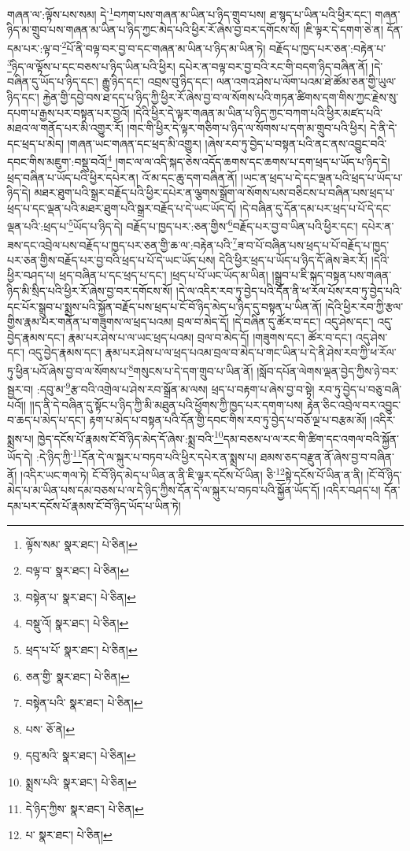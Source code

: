 གཞན་ལ་:ལྟོས་པས་སམ། དེ་\footnote{ལྟོས་སམ་  སྣར་ཐང་།  པེ་ཅིན། }བཀག་པས་གཞན་མ་ཡིན་པ་ཉིད་གྲུབ་པས། ཐ་སྙད་པ་ཡིན་པའི་ཕྱིར་དང་། གཞན་ཉིད་མ་གྲུབ་པས་གཞན་མ་ཡིན་པ་ཉིད་ཀྱང་མེད་པའི་ཕྱིར་རོ་ཞེས་བྱ་བར་དགོངས་སོ། །ཇི་ལྟར་དེ་དགག་ཅེ་ན། དོན་དམ་པར་:ལྟ་བ་\footnote{བལྟ་བ་  སྣར་ཐང་།  པེ་ཅིན། }པོ་ནི་བལྟ་བར་བྱ་བ་དང་གཞན་མ་ཡིན་པ་ཉིད་མ་ཡིན་ཏེ། བརྗོད་པ་ཁྱད་པར་ཅན་:བརྟེན་པ་\footnote{བསྟེན་པ་  སྣར་ཐང་།  པེ་ཅིན། }ཉིད་ལ་ལྟོས་པ་དང་བཅས་པ་ཉིད་ཡིན་པའི་ཕྱིར། དཔེར་ན་བལྟ་བར་བྱ་བའི་རང་གི་བདག་ཉིད་བཞིན་ནོ། །དེ་བཞིན་དུ་ཡོད་པ་ཉིད་དང་། རྒྱུ་ཉིད་དང་། འབྲས་བུ་ཉིད་དང་། ལན་འགའ་ཤེས་པ་ལོག་པའམ་ཐེ་ཚོམ་ཅན་གྱི་ཡུལ་ཉིད་དང་། རྐྱེན་གྱི་དབྱེ་བས་ཐ་དད་པ་ཉིད་ཀྱི་ཕྱིར་རོ་ཞེས་བྱ་བ་ལ་སོགས་པའི་གཏན་ཚིགས་དག་གིས་ཀྱང་རྗེས་སུ་དཔག་པ་རྒྱས་པར་བསྟན་པར་བྱའོ། །དེའི་ཕྱིར་དེ་ལྟར་གཞན་མ་ཡིན་པ་ཉིད་ཀྱང་བཀག་པའི་ཕྱིར་མཛད་པའི་མཐའ་ལ་གནོད་པར་མི་འགྱུར་རོ། །གང་གི་ཕྱིར་དེ་ལྟར་གཅིག་པ་ཉིད་ལ་སོགས་པ་དག་མ་གྲུབ་པའི་ཕྱིར། དེ་ནི་དེ་དང་ཕྲད་པ་མེད། །གཞན་ཡང་གཞན་དང་ཕྲད་མི་འགྱུར། །ཞེས་རབ་ཏུ་བྱེད་པ་བསྟན་པའི་ནང་ནས་འབྱུང་བའི་དབང་གིས་མཇུག་:བསྡུ་བའོ།\footnote{བསྡུ་འོ།  སྣར་ཐང་།  པེ་ཅིན། } །གང་ལ་ལ་འདི་སྐད་ཅེས་འདོད་ཆགས་དང་ཆགས་པ་དག་ཕྲད་པ་ཡོད་པ་ཉིད་དེ། ཕྲད་བཞིན་པ་ཡོད་པའི་ཕྱིར་དཔེར་ན། འོ་མ་དང་ཆུ་དག་བཞིན་ནོ། །ཡང་ན་ཕྲད་པ་དེ་དང་ལྡན་པའི་ཕྲད་པ་ཡོད་པ་ཉིད་དེ། མཐར་ཐུག་པའི་སྒྲར་བརྗོད་པའི་ཕྱིར་དཔེར་ན་ལྕགས་སྒྲོག་ལ་སོགས་པས་བཅིངས་པ་བཞིན་པས་ཕྲད་པ་ཕྲད་པ་དང་ལྡན་པའི་མཐར་ཐུག་པའི་སྒྲར་བརྗོད་པ་དེ་ཡང་ཡོད་དོ། །དེ་བཞིན་དུ་དོན་དམ་པར་ཕྲད་པ་པོ་དེ་དང་ལྡན་པའི་:ཕྲད་པ་\footnote{ཕྲད་པ་པོ་  སྣར་ཐང་།  པེ་ཅིན། }ཡོད་པ་ཉིད་དེ། བརྗོད་པ་ཁྱད་པར་:ཅན་གྱིས་\footnote{ཅན་གྱི་  སྣར་ཐང་།  པེ་ཅིན། }བརྗོད་པར་བྱ་བ་ཡིན་པའི་ཕྱིར་དང་། དཔེར་ན་ཟས་དང་འབྲེལ་པས་བརྗོད་པ་ཁྱད་པར་ཅན་གྱི་ཆ་ལ་:བརྟེན་པའི་\footnote{བསྟེན་པའི་  སྣར་ཐང་།  པེ་ཅིན། }ཟ་བ་པོ་བཞིན་པས་ཕྲད་པ་པོ་བརྗོད་པ་ཁྱད་པར་ཅན་གྱིས་བརྗོད་པར་བྱ་བའི་ཕྲད་པ་པོ་དེ་ཡང་ཡོད་པས། དེའི་ཕྱིར་ཕྲད་པ་ཡོད་པ་ཉིད་དོ་ཞེས་ཟེར་རོ། །དེའི་ཕྱིར་བཤད་པ། ཕྲད་བཞིན་པ་དང་ཕྲད་པ་དང་། །ཕྲད་པ་པོ་ཡང་ཡོད་མ་ཡིན། །སྒྲུབ་པ་ཇི་སྐད་བསྟན་པས་གཞན་ཉིད་མི་སྲིད་པའི་ཕྱིར་རོ་ཞེས་བྱ་བར་དགོངས་སོ། །དེ་ལ་འདིར་རབ་ཏུ་བྱེད་པའི་དོན་ནི་ཕ་རོལ་པོས་རབ་ཏུ་བྱེད་པའི་དང་པོར་སྒྲུབ་པ་སྨྲས་པའི་སྐྱོན་བརྗོད་པས་ཕྲད་པ་ངོ་བོ་ཉིད་མེད་པ་ཉིད་དུ་བསྟན་པ་ཡིན་ནོ། །དེའི་ཕྱིར་རབ་ཀྱི་རྩལ་གྱིས་རྣམ་པར་གནོན་པ་གཟུགས་ལ་ཕྲད་པའམ། བྲལ་བ་མེད་དོ། །དེ་བཞིན་དུ་ཚོར་བ་དང་། འདུ་ཤེས་དང་། འདུ་བྱེད་རྣམས་དང་། རྣམ་པར་ཤེས་པ་ལ་ཡང་ཕྲད་པའམ། བྲལ་བ་མེད་དོ། །གཟུགས་དང་། ཚོར་བ་དང་། འདུ་ཤེས་དང་། འདུ་བྱེད་རྣམས་དང་། རྣམ་པར་ཤེས་པ་ལ་ཕྲད་པའམ་བྲལ་བ་མེད་པ་གང་ཡིན་པ་དེ་ནི་ཤེས་རབ་ཀྱི་ཕ་རོལ་ཏུ་ཕྱིན་པའོ་ཞེས་བྱ་བ་ལ་སོགས་པ་\footnote{པས་  ཅོ་ནེ། }གསུངས་པ་དེ་དག་གྲུབ་པ་ཡིན་ནོ། །སློབ་དཔོན་ལེགས་ལྡན་བྱེད་ཀྱིས་ཉེ་བར་སྦྱར་བ། :དབུ་མ་\footnote{དབུ་མའི་  སྣར་ཐང་།  པེ་ཅིན། }རྩ་བའི་འགྲེལ་པ་ཤེས་རབ་སྒྲོན་མ་ལས། ཕྲད་པ་བརྟག་པ་ཞེས་བྱ་བ་སྟེ། རབ་ཏུ་བྱེད་པ་བཅུ་བཞི་པའོ།། །།ད་ནི་དེ་བཞིན་དུ་སྟོང་པ་ཉིད་ཀྱི་མི་མཐུན་པའི་ཕྱོགས་ཀྱི་ཁྱད་པར་དགག་པས། རྟེན་ཅིང་འབྲེལ་བར་འབྱུང་བ་ཆད་པ་མེད་པ་དང་། རྟག་པ་མེད་པ་བསྟན་པའི་དོན་གྱི་དབང་གིས་རབ་ཏུ་བྱེད་པ་བཅོ་ལྔ་པ་བརྩམ་མོ། །འདིར་སྨྲས་པ། ཁྱེད་དངོས་པོ་རྣམས་ངོ་བོ་ཉིད་མེད་དོ་ཞེས་:སྨྲ་བའི་\footnote{སྨྲས་པའི་  སྣར་ཐང་།  པེ་ཅིན། }དམ་བཅས་པ་ལ་རང་གི་ཚིག་དང་འགལ་བའི་སྐྱོན་ཡོད་དེ། :དེ་ཉིད་ཀྱི་\footnote{དེ་ཉིད་ཀྱིས་  སྣར་ཐང་།  པེ་ཅིན། }དོན་དེ་ལ་སྐུར་པ་བཏབ་པའི་ཕྱིར་དཔེར་ན་སྨྲས་པ། ཐམས་ཅད་བརྫུན་ནོ་ཞེས་བྱ་བ་བཞིན་ནོ། །འདིར་ཡང་གལ་ཏེ། ངོ་བོ་ཉིད་མེད་པ་ཡིན་ན་ནི་ཇི་ལྟར་དངོས་པོ་ཡིན། ཅི་\footnote{པ་  སྣར་ཐང་།  པེ་ཅིན། }སྟེ་དངོས་པོ་ཡིན་ན་ནི། །ངོ་བོ་ཉིད་མེད་པ་མ་ཡིན་པས་དམ་བཅས་པ་ལ་དེ་ཉིད་ཀྱིས་དོན་དེ་ལ་སྐུར་པ་བཏབ་པའི་སྐྱོན་ཡོད་དོ། །འདིར་བཤད་པ། དོན་དམ་པར་དངོས་པོ་རྣམས་ངོ་བོ་ཉིད་ཡོད་པ་ཡིན་ཏེ། 